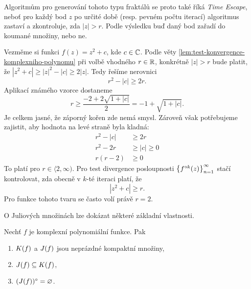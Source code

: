 Algoritmům pro generování tohoto typu fraktálů se proto také říká \emph{Time Escape}, neboť pro každý bod $z$ po určité době (resp. pevném počtu iterací) algoritmus zastaví a zkontroluje, zda $|z|>r$. Podle výsledku buď daný bod zařadí do koumané množiny, nebo ne.
\begin{example}
    Vezměme si funkci $f(z)=z^2+c$, kde $c\in\mathbb{C}$. Podle věty \ref{lem:test-konvergence-komplexniho-polynomu} při volbě vhodného $r\in\mathbb{R}$, konkrétně $|z|>r$ bude platit, že $|z^2+c|\geqslant|z|^2-|c|\geqslant 2|z|$. Tedy řešíme nerovnici
    \[r^2-|c|\geqslant 2r.\]
    Aplikací známého vzorce dostaneme
    \[r\geqslant\frac{-2+2\sqrt{1+|c|}}{2}=-1+\sqrt{1+|c|}.\]
    Je celkem jasné, že záporný kořen zde nemá smysl. Zároveň však potřebujeme zajistit, aby hodnota na levé straně byla kladná:
    \begin{align*}
        r^2-|c|&\geqslant 2r\\
        r^2-2r&\geqslant|c|\geqslant 0\\
        r(r-2)&\geqslant 0
    \end{align*}
    To platí pro $r\in\langle 2,\infty)$. Pro test divergence posloupnosti $\left\{f^{\circ k}(z)\right\}_{n=1}^\infty$ stačí kontrolovat, zda obecně v $k$-té iteraci platí, že
    \[|z^2+c|\geqslant r.\]
    Pro funkce tohoto tvaru se často volí právě $r=2$.
\end{example}
O Juliových množinách lze dokázat některé základní vlastnosti.
\begin{theorem}\label{thm:vztah-kf-a-jf}
    Nechť $f$ je komplexní polynomiální funkce. Pak
    \begin{enumerate}[label=(\roman*)]
        \item\label{thm:kompaktnost-kf-jf} $K(f)$ a $J(f)$ jsou neprázdné kompaktní množiny,
        \item\label{thm:jf-podmnozina-kf} $J(f)\subseteq K(f)$,
        \item\label{thm:vnitrek-jf-neprazdny} $(J(f))^\circ=\varnothing$.
    \end{enumerate}
\end{theorem}
